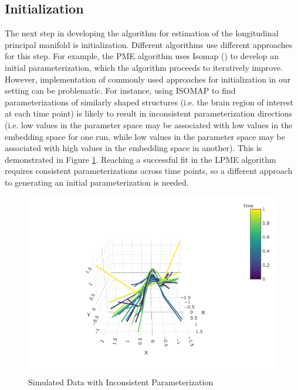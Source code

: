 \documentclass[11pt,reqno]{article}
\renewcommand{\textwidth}{180mm}
\theoremstyle{definition}
\begin{document}
\subsection*{Initialization}

The next step in developing the algorithm for estimation of the longitudinal principal manifold is initialization. Different algorithms use different approaches for this step. For example, the PME algorithm uses Isomap (\cite{tenenbaumGlobalGeometricFramework2000}) to develop an initial parameterization, which the algorithm proceeds to iteratively improve. However, implementation of commonly used approaches for initialization in our setting can be problematic. For instance, using ISOMAP to find parameterizations of similarly shaped structures (i.e. the brain region of interest at each time point) is likely to result in inconsistent parameterization directions (i.e. low values in the parameter space may be associated with low values in the embedding space for one run, while low values in the parameter space may be associated with high values in the embedding space in another). This is demonstrated in Figure \ref{fig:inconsistent_parameterization}. Reaching a successful fit in the LPME algorithm requires consistent parameterizations across time points, so a different approach to generating an initial parameterization is needed. 

\begin{figure}[h]
  \centering
  \includegraphics[width=\textwidth]{inconsistent_parameterization}
  \caption{Simulated Data with Inconsistent Parameterization}
  \label{fig:inconsistent_parameterization}
\end{figure}
\end{document}
